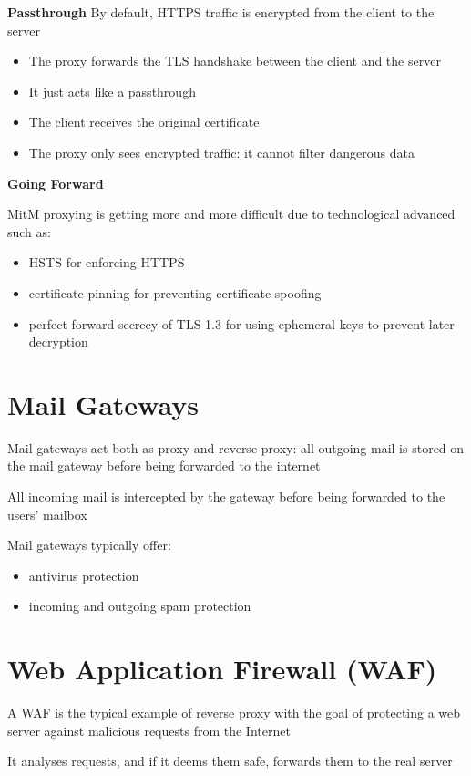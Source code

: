 \documentclass[11pt]{article}
\begin{document}
\textbf{Passthrough}
By default, HTTPS traffic is encrypted from the client to the server

\begin{itemize}
	\item The proxy forwards the TLS handshake between the client and the server
	\item It just acts like a passthrough
	\item The client receives the original certificate
	\item The proxy only sees encrypted traffic: it cannot filter dangerous data
\end{itemize}

\textbf{Going Forward}

MitM proxying is getting more and more difficult due to technological advanced such as: 
\begin{itemize}
	\item HSTS for enforcing HTTPS
	\item certificate pinning for preventing certificate spoofing
	\item perfect forward secrecy of TLS 1.3 for using ephemeral keys to prevent later decryption 
\end{itemize}

\section*{Mail Gateways}

Mail gateways act both as proxy and reverse proxy: all outgoing mail is stored on the mail gateway before being forwarded to the internet

All incoming mail is intercepted by the gateway before being forwarded to the users' mailbox

Mail gateways typically offer:
\begin{itemize}
	\item antivirus protection
	\item incoming and outgoing spam protection
\end{itemize}

\section*{Web Application Firewall (WAF)}

A WAF is the typical example of reverse proxy with the goal of protecting a web server against malicious requests from the Internet

It analyses requests, and if it deems them safe, forwards them to the real server
\end{document}
